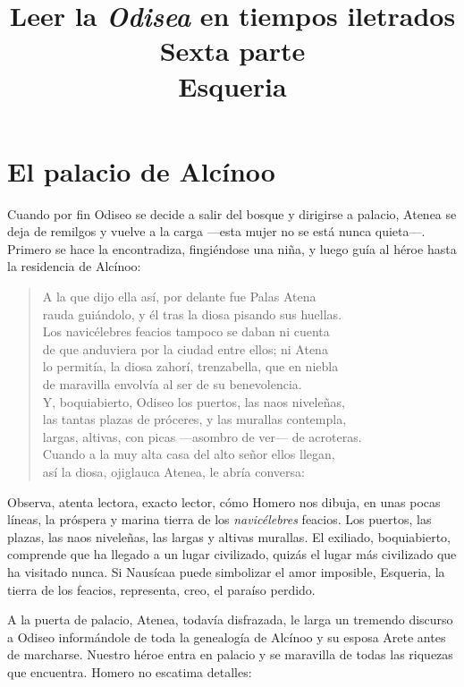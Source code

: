 \documentclass[11pt,a4paper]{article}
\title{Leer la \emph{Odisea} en tiempos iletrados \\ Sexta parte \\ Esqueria}
\author{}
\date{}
\begin{document}
\maketitle

\section*{El palacio de Alcínoo}

Cuando por fin Odiseo se decide a salir del bosque y dirigirse a palacio, Atenea se deja de remilgos y vuelve a la carga ---esta mujer no se está nunca quieta---. Primero se hace la encontradiza, fingiéndose una niña, y luego guía al héroe hasta la residencia de Alcínoo:

\begin{verse}
A la que dijo ella así, por delante fue Palas Atena\\
rauda guiándolo, y él tras la diosa pisando sus huellas.\\
Los navicélebres feacios tampoco se daban ni cuenta\\
de que anduviera por la ciudad entre ellos; ni Atena\\
lo permitía, la diosa zahorí, trenzabella, que en niebla\\
de maravilla envolvía al ser de su benevolencia.\\
Y, boquiabierto, Odiseo los puertos, las naos niveleñas,\\
las tantas plazas de próceres, y las murallas contempla,\\
largas, altivas, con picas ---asombro de ver--- de acroteras.\\
Cuando a la muy alta casa del alto señor ellos llegan,\\
así la diosa, ojiglauca Atenea, le abría conversa:
\end{verse}

Observa, atenta lectora, exacto lector, cómo Homero nos dibuja, en unas pocas líneas, la próspera y marina tierra de los \emph{navicélebres} feacios. Los puertos, las plazas, las naos niveleñas, las largas y altivas murallas. El exiliado, boquiabierto, comprende que ha llegado a un lugar civilizado, quizás el lugar más civilizado que ha visitado nunca. Si Nausícaa puede simbolizar el amor imposible, Esqueria, la tierra de los feacios, representa, creo, el paraíso perdido.

A la puerta de palacio, Atenea, todavía disfrazada, le larga un tremendo discurso a Odiseo informándole de toda la genealogía de Alcínoo y su esposa Arete antes de marcharse. Nuestro héroe entra en palacio y se maravilla de todas las riquezas que encuentra. Homero no escatima detalles:
\end{document}
